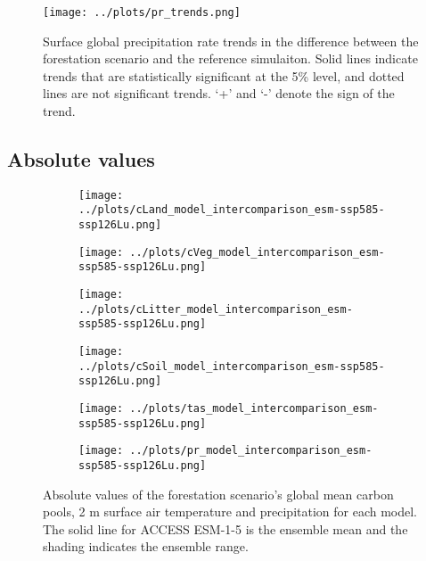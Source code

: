 \documentclass[]{article}
\begin{document}
\begin{figure}[H]
    \centering
    \texttt{[image: ../plots/pr\_trends.png]}
    \caption{Surface global precipitation rate trends in the difference between the forestation scenario and the reference simulaiton. Solid lines indicate trends that are statistically significant at the 5\% level, and dotted lines are not significant trends. `+' and `-' denote the sign of the trend.}
    \label{fig:models_pr_trends}
\end{figure}

\subsection{Absolute values}

\begin{figure}[H]
    \centering
    \begin{subfigure}[b]{0.45\linewidth}
        \texttt{[image: ../plots/cLand\_model\_intercomparison\_esm-ssp585-ssp126Lu.png]}
    \end{subfigure}
    \begin{subfigure}[b]{0.45\linewidth}
        \texttt{[image: ../plots/cVeg\_model\_intercomparison\_esm-ssp585-ssp126Lu.png]}
    \end{subfigure}
    \begin{subfigure}[b]{0.45\linewidth}
        \texttt{[image: ../plots/cLitter\_model\_intercomparison\_esm-ssp585-ssp126Lu.png]}
    \end{subfigure}
    \begin{subfigure}[b]{0.45\linewidth}
        \texttt{[image: ../plots/cSoil\_model\_intercomparison\_esm-ssp585-ssp126Lu.png]}
    \end{subfigure}
    \begin{subfigure}[b]{0.45\linewidth}
        \texttt{[image: ../plots/tas\_model\_intercomparison\_esm-ssp585-ssp126Lu.png]}
    \end{subfigure}
    \begin{subfigure}[b]{0.45\linewidth}
        \texttt{[image: ../plots/pr\_model\_intercomparison\_esm-ssp585-ssp126Lu.png]}
    \end{subfigure}
    \caption{Absolute values of the forestation scenario's global mean carbon pools, 2 m surface air temperature and precipitation for each model. The solid line for ACCESS ESM-1-5 is the ensemble mean and the shading indicates the ensemble range.}
    \label{fig:models_absolute}
\end{figure}
\end{document}
